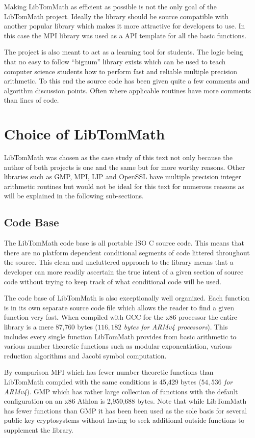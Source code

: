 \documentclass[b5paper]{book}
\begin{document}
Making LibTomMath as efficient as possible is not the only goal of the LibTomMath project.  Ideally the library should 
be source compatible with another popular library which makes it more attractive for developers to use.  In this case the
MPI library was used as a API template for all the basic functions.

The project is also meant to act as a learning tool for students.  The logic being that no easy to follow ``bignum'' 
library exists which can be used to teach computer science students how to perform fast and reliable multiple precision 
arithmetic.  To this end the source code has been given quite a few comments and algorithm discussion points.  Often 
where applicable routines have more comments than lines of code.

\section{Choice of LibTomMath}
LibTomMath was chosen as the case study of this text not only because the author of both projects is one and the same but
for more worthy reasons.  Other libraries such as GMP, MPI, LIP and OpenSSL have multiple precision 
integer arithmetic routines but would not be ideal for this text for numerous reasons as will be explained in the 
following sub-sections.

\subsection{Code Base}
The LibTomMath code base is all portable ISO C source code.  This means that there are no platform dependent conditional
segments of code littered throughout the source.  This clean and uncluttered approach to the library means that a
developer can more readily ascertain the true intent of a given section of source code without trying to keep track of
what conditional code will be used.

The code base of LibTomMath is also exceptionally well organized.  Each function is in its own separate source code file 
which allows the reader to find a given function very fast.  When compiled with GCC for the x86 processor the entire 
library is a mere 87,760 bytes (\textit{$116,182$ bytes for ARMv4 processors}).  This includes every single function 
LibTomMath provides from basic arithmetic to various number theoretic functions such as modular exponentiation, various 
reduction algorithms and Jacobi symbol computation.  

By comparison MPI which has fewer number theoretic functions than LibTomMath compiled with the same conditions is 
45,429 bytes (\textit{$54,536$ for ARMv4}).  GMP which has rather large collection of functions with the default 
configuration on an x86 Athlon is 2,950,688 bytes.  Note that while LibTomMath has fewer functions than GMP it has been
been used as the sole basis for several public key cryptosystems without having to seek additional outside functions
to supplement the library.
\end{document}
